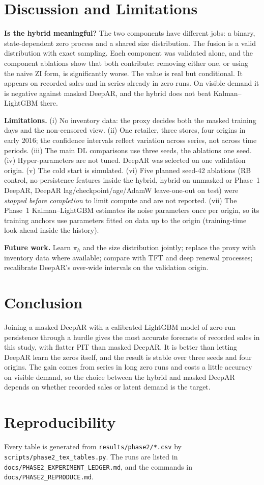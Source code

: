 \documentclass[conference]{IEEEtran}
\begin{document}
\section{Discussion and Limitations}
\textbf{Is the hybrid meaningful?} The two components have different jobs: a binary, state-dependent zero process and a shared size distribution. The fusion is a valid distribution with exact sampling. Each component was validated alone, and the component ablations show that both contribute: removing either one, or using the naive ZI form, is significantly worse. The value is real but conditional. It appears on recorded sales and in series already in zero runs. On visible demand it is negative against masked DeepAR, and the hybrid does not beat Kalman--LightGBM there.

\textbf{Limitations.} (i) No inventory data: the proxy decides both the masked training days and the non-censored view. (ii) One retailer, three stores, four origins in early 2016; the confidence intervals reflect variation across series, not across time periods. (iii) The main DL comparisons use three seeds, the ablations one seed. (iv) Hyper-parameters are not tuned. DeepAR was selected on one validation origin. (v) The cold start is simulated. (vi) Five planned seed-42 ablations (RB control, no-persistence features inside the hybrid, hybrid on unmasked or Phase~1 DeepAR, DeepAR lag/checkpoint/age/AdamW leave-one-out on test) were \emph{stopped before completion} to limit compute and are not reported. (vii) The Phase~1 Kalman--LightGBM estimates its noise parameters once per origin, so its training anchors use parameters fitted on data up to the origin (training-time look-ahead inside the history).

\textbf{Future work.} Learn $\pi_h$ and the size distribution jointly; replace the proxy with inventory data where available; compare with TFT and deep renewal processes; recalibrate DeepAR's over-wide intervals on the validation origin.

\section{Conclusion}
Joining a masked DeepAR with a calibrated LightGBM model of zero-run persistence through a hurdle gives the most accurate forecasts of recorded sales in this study, with flatter PIT than masked DeepAR. It is better than letting DeepAR learn the zeros itself, and the result is stable over three seeds and four origins. The gain comes from series in long zero runs and costs a little accuracy on visible demand, so the choice between the hybrid and masked DeepAR depends on whether recorded sales or latent demand is the target.

\section*{Reproducibility}
Every table is generated from \texttt{results/phase2/*.csv} by \texttt{scripts/phase2\_tex\_tables.py}. The runs are listed in \texttt{docs/PHASE2\_EXPERIMENT\_LEDGER.md}, and the commands in \texttt{docs/PHASE2\_REPRODUCE.md}.



\end{document}
